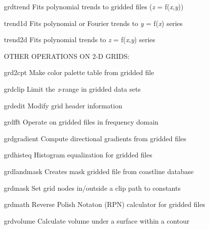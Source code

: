 \documentclass{article}
\begin{document}
\par 	grdtrend	Fits polynomial trends to gridded files ({\it z} = f({\it x},{\it y}))\par 

\par 	trend1d	Fits polynomial or Fourier trends to {\it y} = f({\it x}) series\par 

\par 	trend2d	Fits polynomial trends to {\it z} = f({\it x},{\it y}) series\par 

\par \par 

\par OTHER OPERATIONS ON 2-D GRIDS:\par 

\par 	grd2cpt	Make color palette table from gridded file\par 

\par 	grdclip	Limit the {\it z}-range in gridded data sets\par 

\par 	grdedit	Modify grid header information\par 

\par 	grdfft	Operate on gridded files in frequency domain\par 

\par 	grdgradient	Compute directional gradients from gridded files\par 

\par 	grdhisteq	Histogram equalization for gridded files\par 

\par 	grdlandmask	Creates mask gridded file from coastline database\par 

\par 	grdmask	Set grid nodes in/outside a clip path to constants\par 

\par 	grdmath	Reverse Polish Notaton (RPN) calculator for gridded files\par 

\par 	grdvolume	Calculate volume under a surface within a contour\par 
\end{document}
